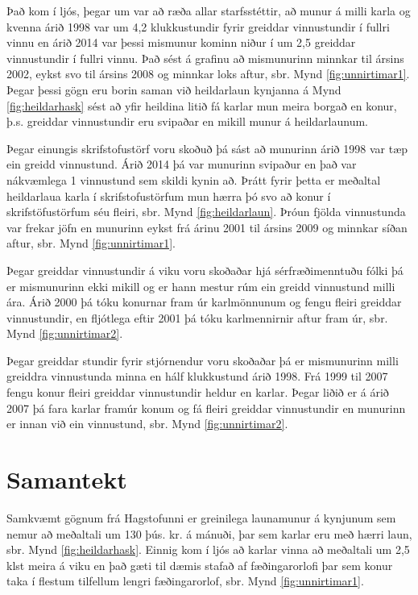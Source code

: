 \documentclass[12pt, git, draft]{rureport}
\begin{document}
Það kom í ljós, þegar um var að ræða allar starfsstéttir, að munur á milli karla og kvenna árið 1998 var um 4,2 klukkustundir fyrir greiddar vinnustundir í fullri vinnu en árið 2014 var þessi mismunur kominn niður í um 2,5 greiddar vinnustundir í fullri vinnu.
Það sést á grafinu að mismunurinn minnkar til ársins 2002, eykst svo til ársins 2008 og minnkar loks aftur, sbr. Mynd \ref{fig:unnirtimar1}. Þegar þessi gögn eru borin saman við heildarlaun kynjanna á Mynd \ref{fig:heildarhask} sést að yfir heildina litið fá karlar mun meira borgað en konur, þ.s. greiddar vinnustundir eru svipaðar en mikill munur á heildarlaunum.

Þegar einungis skrifstofustörf voru skoðuð þá sást að munurinn árið 1998 var tæp ein greidd vinnustund. Árið 2014 þá var munurinn svipaður en það var nákvæmlega 1 vinnustund sem skildi kynin að. Þrátt fyrir þetta er meðaltal heildarlaua karla í skrifstofustörfum mun hærra þó svo að konur í skrifstöfustörfum séu fleiri, sbr. Mynd \ref{fig:heildarlaun}. Þróun fjölda vinnustunda var frekar jöfn en munurinn eykst frá árinu 2001  til ársins 2009 og minnkar síðan aftur, sbr. Mynd \ref{fig:unnirtimar1}.

Þegar greiddar vinnustundir á viku voru skoðaðar hjá sérfræðimenntuðu fólki þá er mismunurinn ekki mikill og er hann mestur rúm ein greidd vinnustund milli ára. Árið 2000 þá tóku konurnar fram úr karlmönnunum og fengu fleiri greiddar vinnustundir, en fljótlega eftir 2001 þá tóku karlmennirnir aftur fram úr, sbr. Mynd \ref{fig:unnirtimar2}.

Þegar greiddar stundir fyrir stjórnendur voru skoðaðar þá er mismunurinn milli greiddra vinnustunda minna en hálf klukkustund árið 1998. Frá 1999 til 2007 fengu konur fleiri greiddar vinnustundir heldur en karlar. Þegar liðið er á árið 2007 þá fara karlar framúr konum og fá fleiri greiddar vinnustundir en munurinn er innan við ein vinnustund, sbr. Mynd \ref{fig:unnirtimar2}. 

\section{Samantekt}

Samkvæmt gögnum frá Hagstofunni\cite{H} er greinilega launamunur á kynjunum sem nemur að meðaltali um 130 þús. kr. á mánuði, þar sem karlar eru með hærri laun, sbr. Mynd \ref{fig:heildarhask}. Einnig kom í ljós að karlar vinna að meðaltali um 2,5 klst meira á viku en það gæti til dæmis stafað af fæðingarorlofi þar sem konur taka í flestum tilfellum lengri fæðingarorlof, sbr. Mynd \ref{fig:unnirtimar1}.
\end{document}
